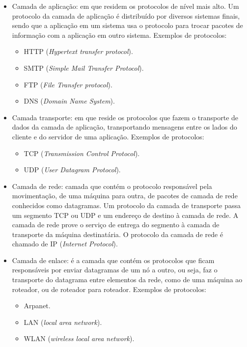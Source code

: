 \begin{itemize}
    \item Camada de aplicação: em que residem os protocolos de nível mais alto. Um protocolo da camada de aplicação é distribuído por diversos sistemas finais, sendo que a aplicação em um sistema usa o protocolo para trocar pacotes de informação com a aplicação em outro sistema.
    Exemplos de protocolos:
    \begin{itemize}
        \item HTTP (\textit{Hypertext transfer protocol}).
        \item SMTP (\textit{Simple Mail Transfer Protocol}). 
        \item FTP (\textit{File Transfer protocol}).
        \item DNS (\textit{Domain Name System}).
    \end{itemize}
    \item Camada transporte: em que reside os protocolos que fazem o transporte de dados da camada de aplicação, transportando mensagens entre os lados do cliente e do servidor de uma aplicação.
    Exemplos de protocolos:
    \begin{itemize}
        \item TCP (\textit{Transmission Control Protocol}).
        \item UDP (\textit{User Datagram Protocol}).
    \end{itemize}
    \item Camada de rede: camada que contém o protocolo responsável pela movimentação, de uma máquina para outra, de pacotes de camada de rede conhecidos como datagramas. Um protocolo da camada de transporte passa um segmento TCP ou UDP e um endereço de destino à camada de rede. A camada de rede prove o serviço de entrega do segmento à camada de transporte da máquina destinatária. O protocolo da camada de rede é chamado de IP (\textit{Internet Protocol}).
    \item Camada de enlace: é a camada que contém os protocolos que ficam responsáveis por enviar datagramas de um nó a outro, ou seja, faz o transporte do datagrama entre elementos da rede, como de uma máquina ao roteador, ou de roteador para roteador. Exemplos de protocolos:
    \begin{itemize}
        \item Arpanet.
        \item LAN (\textit{local area network}).
        \item WLAN (\textit{wireless local area network}).\newline
    \end{itemize}

\end{itemize}

